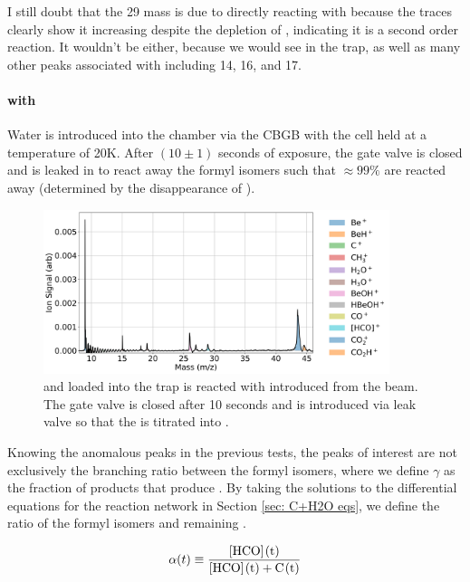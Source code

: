 I still doubt that the 29 mass is due to  directly reacting with  because the traces clearly show it increasing despite the depletion of , indicating it is a second order reaction. It wouldn't be  either, because we would see  in the trap, as well as many other peaks associated with  including 14, 16, and 17.

\paragraph{ with }
Water is introduced into the chamber via the CBGB with the cell held at a temperature of 20K. After $(10 \pm 1)$ seconds of exposure, the gate valve is closed and  is leaked in to react away the formyl isomers such that $\approx 99\%$ are reacted away (determined by the disappearance of ).

\begin{figure}[H]
	\centering
	\includegraphics[width=0.9\textwidth]{images/C_H2O_CO2_titration_TOF.png}
	\caption{ and  loaded into the trap is reacted with  introduced from the beam. The gate valve is closed after 10 seconds and  is introduced via leak valve so that the  is titrated into .}
\end{figure}

Knowing the anomalous peaks in the previous tests, the peaks of interest are not exclusively the branching ratio between the formyl isomers, where we define $\gamma$ as the fraction of products that produce . By taking the solutions to the differential equations for the  reaction network in Section \ref{sec: C+H2O eqs}, we define the ratio of the formyl isomers and remaining .

\begin{equation}
	\alpha(t) \equiv \frac{\ce{[HCO](t)}}{\ce{[HCO](t) + C(t)}}
\end{equation}

